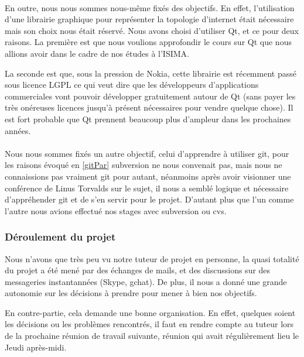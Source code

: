 \paragraph{} En outre, nous nous sommes nous-même fixés des objectifs. En effet, l'utilisation d'une librairie graphique pour représenter la topologie d'internet était nécessaire mais son choix nous était réservé. Nous avons choisi d'utiliser Qt, et ce pour deux raisons. La première est que nous voulions approfondir le cours sur Qt que nous allions avoir dans le cadre de nos études à l'ISIMA.

La seconde est que, sous la pression de Nokia, cette librairie est récemment passé sous licence LGPL ce qui veut dire que les développeurs d'applications commerciales vont pouvoir développer gratuitement autour de Qt (sans payer les très onéreuses licences jusqu'à présent nécessaires pour vendre quelque chose). Il est fort probable que Qt prennent beaucoup plus d'ampleur dans les prochaines années.

\paragraph{} Nous nous sommes fixés un autre objectif, celui d'apprendre à utiliser git, pour les raisons évoqué en \ref{gitPar} subversion ne nous convenait pas, mais nous ne connaissions pas vraiment git pour autant, néanmoins après avoir visionner une conférence de Linus Torvalds sur le sujet, il nous a semblé logique et nécessaire d'appréhender git et de s'en servir pour le projet. D'autant plus que l'un comme l'autre nous avions effectué nos stages avec subversion ou cvs.

\subsubsection{Déroulement du projet}

Nous n'avons que très peu vu notre tuteur de projet en personne, la quasi totalité du projet a été mené par des échanges de mails, et des discussions sur des messageries instantannées (Skype, gchat). De plus, il nous a donné une grande autonomie sur les décisions à prendre pour mener à bien nos objectifs.

En contre-partie, cela demande une bonne organisation. En effet, quelques soient les décisions ou les problèmes rencontrés, il faut en rendre compte au tuteur lors de la prochaine réunion de travail suivante, réunion qui avait régulièrement lieu le Jeudi après-midi.

